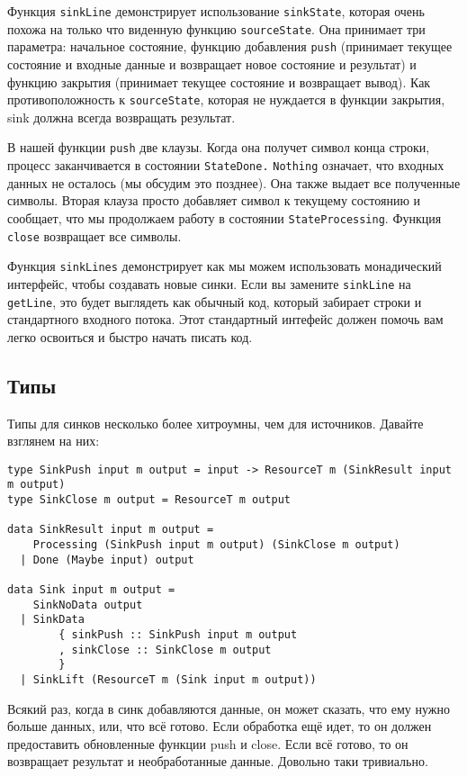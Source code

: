 Функция \lstinline=sinkLine= демонстрирует использование \lstinline=sinkState=, которая
очень похожа на только что
виденную функцию \lstinline=sourceState=. Она принимает три параметра: начальное
состояние,
функцию добавления \verb=push= 
(принимает текущее состояние и входные данные и возвращает новое состояние и результат)
и функцию закрытия (принимает текущее состояние и возвращает вывод). Как
противоположность к \lstinline=sourceState=, которая не нуждается в функции закрытия, sink
должна всегда возвращать результат.

В нашей функции \lstinline=push= две клаузы. Когда она получет символ конца строки,
процесс заканчивается в состоянии \lstinline=StateDone.= \lstinline=Nothing= означает,
что
входных данных не
осталось (мы обсудим это позднее). Она также выдает все полученные символы. Вторая
клауза просто добавляет символ к текущему состоянию и сообщает, что мы продолжаем работу
в состоянии \lstinline=StateProcessing=. Функция \lstinline=close= возвращает все символы.

Функция \lstinline=sinkLines= демонстрирует как мы можем использовать монадический
интерфейс, чтобы создавать новые синки. Если вы замените \lstinline=sinkLine= на
\lstinline=getLine=, это будет выглядеть
как обычный код, который забирает строки и стандартного входного потока. Этот
стандартный интефейс должен помочь вам легко освоиться и быстро начать писать код.

\subsection{Типы}

Типы для синков несколько более хитроумны, чем для источников. Давайте взглянем на них:
\begin{lstlisting}
type SinkPush input m output = input -> ResourceT m (SinkResult input m output)
type SinkClose m output = ResourceT m output

data SinkResult input m output =
    Processing (SinkPush input m output) (SinkClose m output)
  | Done (Maybe input) output

data Sink input m output =
    SinkNoData output
  | SinkData
        { sinkPush :: SinkPush input m output
        , sinkClose :: SinkClose m output
        }
  | SinkLift (ResourceT m (Sink input m output))
\end{lstlisting}  
Всякий раз, когда в синк добавляются данные, он может сказать, что ему нужно больше
данных, или, что всё готово. Если обработка ещё идет, то он должен предоставить
обновленные функции push и close. Если всё готово, то он возвращает результат и
необработанные данные. Довольно таки тривиально.
 
